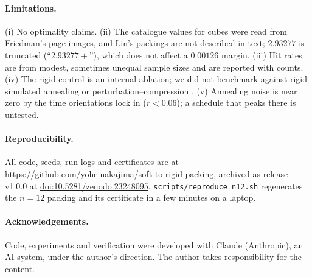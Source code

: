 \documentclass[11pt]{article}
\begin{document}
\paragraph{Limitations.} (i) No optimality claims. (ii) The catalogue values for cubes were read from Friedman's page images, and Lin's packings are not described in text; $2.93277$ is truncated (``$2.93277+$''), which does not affect a $0.00126$ margin. (iii) Hit rates are from modest, sometimes unequal sample sizes and are reported with counts. (iv) The rigid control is an internal ablation; we did not benchmark against rigid simulated annealing or perturbation--compression \cite{gensane}. (v) Annealing noise is near zero by the time orientations lock in ($r<0.06$); a schedule that peaks there is untested.

\paragraph{Reproducibility.} All code, seeds, run logs and certificates are at \url{https://github.com/yoheinakajima/soft-to-rigid-packing}, archived as release v1.0.0 at \href{https://doi.org/10.5281/zenodo.23248095}{doi:10.5281/zenodo.23248095}. \texttt{scripts/reproduce\_n12.sh} regenerates the $n=12$ packing and its certificate in a few minutes on a laptop.

\paragraph{Acknowledgements.} Code, experiments and verification were developed with Claude (Anthropic), an AI system, under the author's direction. The author takes responsibility for the content.




\appendix
\end{document}
